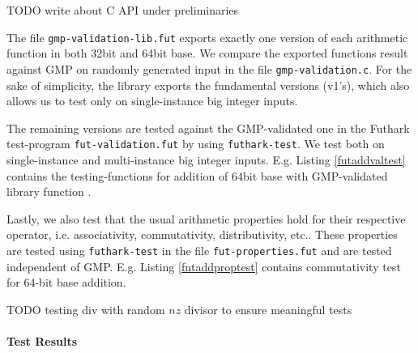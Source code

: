 {\color{red} TODO write about C API under preliminaries}

The file \texttt{gmp-validation-lib.fut} exports exactly one version of each
arithmetic function in both 32bit and 64bit base. We compare the exported
functions result against GMP on randomly generated input in the file
\texttt{gmp-validation.c}. For the sake of simplicity, the library exports the
fundamental versions (v1's), which also allows us to test only on
single-instance big integer inputs.

The remaining versions are tested against the GMP-validated one in the Futhark
test-program \texttt{fut-validation.fut} by using \texttt{futhark-test}. We test
both on single-instance and multi-instance big integer inputs. E.g. Listing
\ref{futaddvaltest} contains the testing-functions for addition of 64bit base
with GMP-validated library function .

% 

Lastly, we also test that the usual arithmetic properties hold for their
respective operator, i.e. associativity, commutativity, distributivity,
etc.. These properties are tested using \texttt{futhark-test} in the file
\texttt{fut-properties.fut} and are tested independent of GMP. E.g. Listing
\ref{futaddproptest} contains commutativity test for 64-bit base addition.

% 

{\color{red} TODO testing div with random $nz$ divisor to ensure meaningful tests}

\paragraph{Test Results}

{\red [Missing]}


